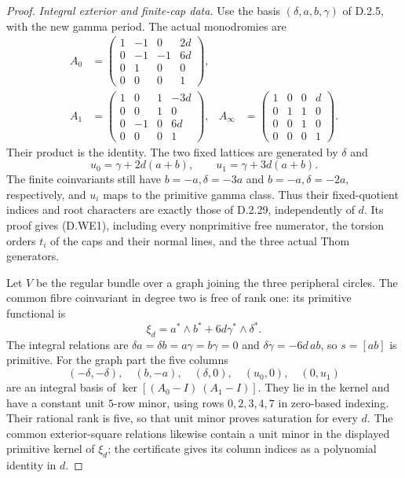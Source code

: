 \begin{proof}
\emph{Integral exterior and finite-cap data.}
Use the basis $(\delta,a,b,\gamma)$ of D.2.5, with
the new gamma period. The actual monodromies are
\[
\begin{aligned}
 A_0&=\begin{pmatrix}
 1&-1&0&2d\\0&-1&-1&6d\\0&1&0&0\\0&0&0&1
 \end{pmatrix},\\
 A_1&=\begin{pmatrix}
 1&0&1&-3d\\0&0&1&0\\0&-1&0&6d\\0&0&0&1
 \end{pmatrix},&
 A_\infty&=\begin{pmatrix}
 1&0&0&d\\0&1&1&0\\0&0&1&0\\0&0&0&1
 \end{pmatrix}.
\end{aligned}                                             \tag{D.WE10}
\]
Their product is the identity. The two fixed lattices
are generated by $\delta$ and
\[
 u_0=\gamma+2d(a+b),\qquad
 u_1=\gamma+3d(a+b).
\]
The finite coinvariants still have
$b=-a,\delta=-3a$ and $b=-a,\delta=-2a$,
respectively, and $u_i$ maps to the primitive gamma
class. Thus their fixed-quotient indices and root
characters are exactly those of D.2.29, independently
of $d$. Its proof gives (D.WE1), including every
nonprimitive free numerator, the torsion orders
$t_i$ of the caps and their normal lines, and the
three actual Thom generators.

Let $V$ be the regular bundle over a graph joining
the three peripheral circles. The common fibre
coinvariant in degree two is free of rank one:
its primitive functional is
\[
 \xi_d=a^*\wedge b^*+6d\gamma^*\wedge\delta^* .
\]
The integral relations are
$\delta a=\delta b=a\gamma=b\gamma=0$ and
$\delta\gamma=-6d\,ab$, so $s=[ab]$ is primitive.
For the graph part the five columns
\[
 (-\delta,-\delta),\quad(b,-a),\quad
 (\delta,0),\quad(u_0,0),\quad(0,u_1)                     \tag{D.WE11}
\]
are an integral basis of
$\ker[(A_0-I)\ (A_1-I)]$.
They lie in the kernel and have a constant unit
$5$-row minor, using rows $0,2,3,4,7$ in zero-based
indexing. Their rational rank is five, so that unit
minor proves saturation for every $d$.
The common exterior-square relations likewise contain
a unit minor in the displayed primitive kernel of
$\xi_d$; the certificate gives its column indices
as a polynomial identity in $d$.


\end{proof}
